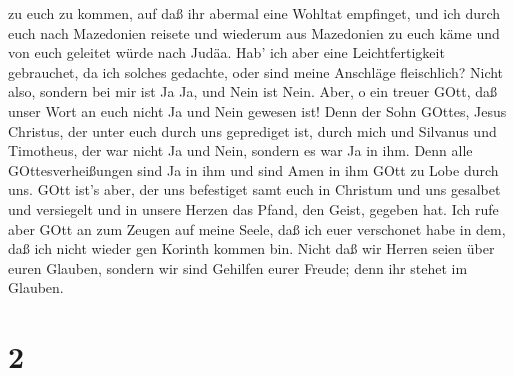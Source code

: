 zu euch zu kommen, auf daß ihr abermal eine Wohltat empfinget,
 und ich durch euch nach Mazedonien reisete und wiederum
aus Mazedonien zu euch käme und von euch geleitet würde nach Judäa.
 Hab' ich aber eine Leichtfertigkeit gebrauchet, da ich
solches gedachte, oder sind meine Anschläge fleischlich? Nicht also,
sondern bei mir ist Ja Ja, und Nein ist Nein.  Aber, o ein
treuer GOtt, daß unser Wort an euch nicht Ja und Nein gewesen ist!
 Denn der Sohn GOttes, Jesus Christus, der unter euch durch
uns geprediget ist, durch mich und Silvanus und Timotheus, der war nicht
Ja und Nein, sondern es war Ja in ihm.  Denn alle
GOttesverheißungen sind Ja in ihm und sind Amen in ihm GOtt zu Lobe
durch uns.  GOtt ist's aber, der uns befestiget samt euch
in Christum und uns gesalbet  und versiegelt und in unsere
Herzen das Pfand, den Geist, gegeben hat.  Ich rufe aber
GOtt an zum Zeugen auf meine Seele, daß ich euer verschonet habe in dem,
daß ich nicht wieder gen Korinth kommen bin.  Nicht daß wir
Herren seien über euren Glauben, sondern wir sind Gehilfen eurer Freude;
denn ihr stehet im Glauben.

\hypertarget{section-1}{%
\section{2}\label{section-1}}

